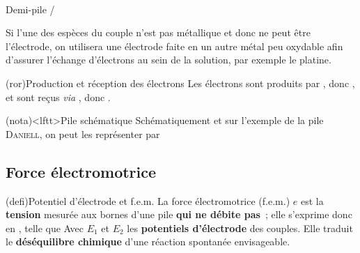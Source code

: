 \documentclass[../../main/main.tex]{subfiles}
\begin{document}
\begin{tcb*}
\begin{minipage}[c]{.30\linewidth}
\begin{center}
{			}
			\\
			Demi-pile /
			\\
		\end{center}
	\end{minipage}
	\smallbreak
	Si l'une des espèces du couple n'est pas métallique et donc ne peut être
	l'électrode, on utilisera une électrode faite en un autre métal peu oxydable
	afin d'assurer l'échange d'électrons au sein de la solution, par exemple le
	platine.
\end{tcb*}

\begin{tcb*}(ror){Production et réception des électrons}
	Les électrons sont produits par , donc
	, et sont reçus \textit{via} ,
	donc .
\end{tcb*}

\begin{tcb*}(nota)<lftt>{Pile schématique}
	Schématiquement et sur l'exemple de la pile \textsc{Daniell}, on peut les
	représenter par
	\vspace{-30pt}
\end{tcb*}

\subsection{Force électromotrice}
\begin{tcb*}(defi){Potentiel d'électrode et f.e.m.}
	La force électromotrice (f.e.m.) $e$ est la \textbf{tension} mesurée aux
	bornes d'une pile \textbf{qui ne débite pas}~; elle s'exprime donc en
	, telle que
	\psw{
		\[
			e = V_+ - V_- = E(\ce{Ox_1}/\ce{Red_1}) - E(\ce{Ox_2}/\ce{Red_2})
		\]
	}%
	Avec $E_1$ et $E_2$ les \textbf{potentiels d'électrode} des couples. Elle
	traduit le \textbf{déséquilibre chimique} d'une réaction spontanée
	envisageable.
\end{tcb*}
\end{document}
